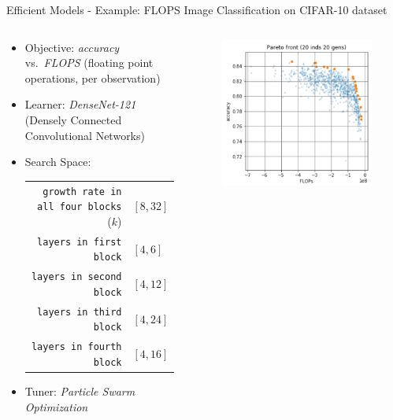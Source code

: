 \begin{frame}{Efficient Models - Example: FLOPS}
Image Classification on CIFAR-10 dataset~
  \begin{columns}
  \begin{column}{0.65\textwidth}
    \begin{itemize}
      \item Objective: \emph{accuracy} vs.\ \emph{FLOPS} (floating point operations, per observation)
      \item Learner: \emph{DenseNet-121} (Densely Connected Convolutional Networks)
      \item Search Space:\\
        \begin{tabular}{rl}
          \texttt{growth rate in all four blocks} ($k$) & $[8,32]$ \\ %
          \texttt{layers in first block} & $[4, 6]$ \\
          \texttt{layers in second block} & $[4, 12] $ \\
          \texttt{layers in third block} & $[4, 24] $ \\
          \texttt{layers in fourth block} & $[4, 16] $ \\
        \end{tabular}
      \item Tuner: \emph{Particle Swarm Optimization}
    \end{itemize}
  \end{column}%
  \begin{column}{0.35\textwidth}
    \begin{figure}
    \includegraphics[width=\textwidth]{images/Wang_et_al_2019_Evolving_Deep_Neural_Networks_fig7_1.png}
    \end{figure}
  \end{column}
  \end{columns}



\end{frame}
